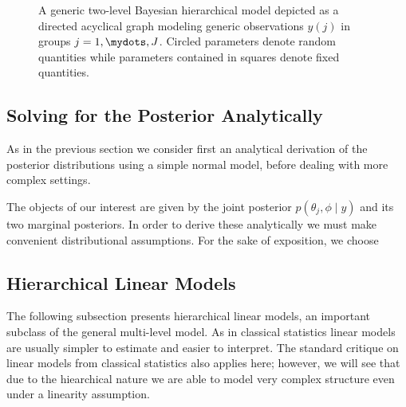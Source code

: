 \begin{figure}[ht]
\begin{center}
\end{center}
\label{tik:group_sem}
\caption{A generic two-level Bayesian hierarchical model depicted as a directed acyclical graph modeling generic observations $y(j)$ in groups $j = 1,\mydots, J$. Circled parameters denote random quantities while parameters contained in squares denote fixed quantities.}
\end{figure}

\subsection{Solving for the Posterior Analytically}
As in the previous section we consider first an analytical derivation of the posterior distributions using a simple normal model, before dealing with more complex settings.

The objects of our interest are given by the joint posterior $p(\theta_j, \phi \mid y)$
and its two marginal posteriors. In order to derive these analytically we must
make convenient distributional assumptions. For the sake of exposition, we choose


\subsection{Hierarchical Linear Models}
The following subsection presents hierarchical linear models, an important subclass of the general multi-level model.
As in classical statistics linear models are usually simpler to estimate and easier to interpret.
The standard critique on linear models from classical statistics also applies here; however, we will see that due to the hiearchical nature we are able to model very complex structure even under a linearity assumption.

